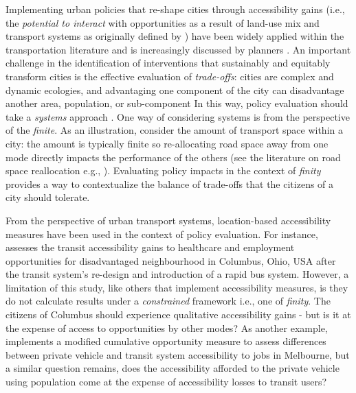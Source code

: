 \documentclass[]{trbunofficial}
\begin{document}
Implementing urban policies that re-shape cities through accessibility
gains (i.e., the \emph{potential to interact} with opportunities as a
result of land-use mix and transport systems as originally defined by
\citet{hansenHowAccessibilityShapes1959}) have been widely applied
within the transportation literature and is increasingly discussed by
planners
\citep{levinsonTransportAccessManual2020, gowerPlanningInnovationCity2022, siddiqToolsTradeAssessing2021, yanAccessibilityBasedPlanningAddressing2021}.
An important challenge in the identification of interventions that
sustainably and equitably transform cities is the effective evaluation
of \emph{trade-offs}: cities are complex and dynamic ecologies, and
advantaging one component of the city can disadvantage another area,
population, or sub-component In this way, policy evaluation should take
a \emph{systems} approach
\citep{fikselSustainabilityResilienceSystems2006}. One way of
considering systems is from the perspective of the \emph{finite}. As an
illustration, consider the amount of transport space within a city: the
amount is typically finite so re-allocating road space away from one
mode directly impacts the performance of the others (see the literature
on road space reallocation e.g.,
\citet{valencaMainChallengesOpportunities2021}). Evaluating policy
impacts in the context of \emph{finity} provides a way to contextualize
the balance of trade-offs that the citizens of a city should tolerate.

From the perspective of urban transport systems, location-based
accessibility measures have been used in the context of policy
evaluation. For instance, \citet{leeMeasuringImpactsNew2018} assesses
the transit accessibility gains to healthcare and employment
opportunities for disadvantaged neighbourhood in Columbus, Ohio, USA
after the transit system's re-design and introduction of a rapid bus
system. However, a limitation of this study, like others that implement
accessibility measures, is they do not calculate results under a
\emph{constrained} framework i.e., one of \emph{finity}. The citizens of
Columbus should experience qualitative accessibility gains - but is it
at the expense of access to opportunities by other modes? As another
example, \citet{mohriClusteringMethodMeasuring2021} implements a
modified cumulative opportunity measure to assess differences between
private vehicle and transit system accessibility to jobs in Melbourne,
but a similar question remains, does the accessibility afforded to the
private vehicle using population come at the expense of accessibility
losses to transit users?
\end{document}
